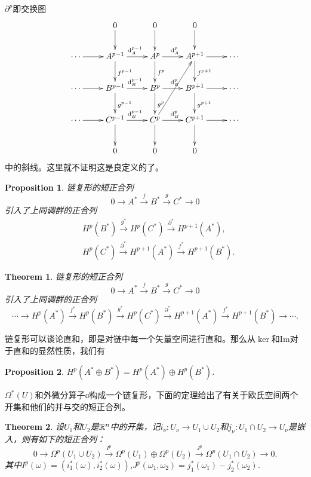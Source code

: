 \documentclass[11pt]{extbook}
\theoremstyle{plain}%
\newtheorem{pro}{Proposition}[section]%
\newtheorem{theo}{Theorem}[section]%
\begin{document}
$\partial^p$即交换图
	\[
		\xymatrix{
		&0\ar[d]&0\ar[d]&0\ar[d]&\\
\cdots\ar[r]&A^{p-1}\ar[r]^{\dd_A^{p-1}}\ar[d]^{f^{p-1}}&A^p\ar[r]^{\dd_A^p}\ar[d]^{f^{p}}&A^{p+1}\ar[r]\ar[d]^{f^{p+1}}&\cdots\\
\cdots\ar[r]&B^{p-1}\ar[r]^{\dd_B^{p-1}}\ar[d]^{g^{p-1}}&B^p\ar[r]^{\dd_B^p}\ar[d]^{g^{p}}&B^{p+1}\ar[r]\ar[d]^{g^{p+1}}&\cdots\\
\cdots\ar[r]&C^{p-1}\ar[r]^{\dd_B^{p-1}}\ar[d]&C^p\ar[r]^{\dd_B^p}\ar[d]\ar[ruu]&C^{p+1}\ar[r]\ar[d]&\cdots\\
&0&0&0&
		}
	\]
中的斜线。这里就不证明这是良定义的了。

\begin{pro}
链复形的短正合列
\[
0\to A^*\xrightarrow{f}B^*\xrightarrow{g}C^*\to 0
\]
引入了上同调群的正合列
\[
\begin{split}
&H^p(B^*)\xrightarrow{g^*}H^p(C^*)\xrightarrow{\partial^*}H^{p+1}(A^*),\\
&H^p(C^*)\xrightarrow{\partial^*}H^{p+1}(A^*)\xrightarrow{f^*}H^{p+1}(B^*).
\end{split}
\]
\end{pro}
\begin{theo}
\label{changzhenghelie}
链复形的短正合列
\[
0\to A^*\xrightarrow{f}B^*\xrightarrow{g}C^*\to 0
\]
引入了上同调群的正合列
\[
\cdots\to H^p(A^*)\xrightarrow{f^*}H^p(B^*)\xrightarrow{g^*}H^p(C^*)\xrightarrow{\partial^*}H^{p+1}(A^*)\xrightarrow{f^*}H^{p+1}(B^*)\to\cdots.
\]
\end{theo}
链复形可以谈论直和，即是对链中每一个矢量空间进行直和。那么从$\ker$和$\mathrm{Im}$对于直和的显然性质，我们有
\begin{pro}
\label{zhihe}
$H^p(A^*\oplus B^*)=H^p(A^*)\oplus H^p(B^*)$.
\end{pro}
$\Omega^*(U)$和外微分算子$\dd$构成一个链复形，下面的定理给出了有关于欧氏空间两个开集和他们的并与交的短正合列。
\begin{theo}
设$U_1$和$U_2$是$\mathbb{R}^n$中的开集，记$i_\nu:U_\nu \to U_1 \cup U_2$和$j_\nu:U_1\cap U_2 \to U_\nu$是嵌入，则有如下的短正合列：
\[
0\to \Omega^p(U_1\cup U_2)\xrightarrow{I^p}\Omega^p(U_1)\oplus\Omega^p(U_2)\xrightarrow{J^p}\Omega^p(U_1\cap U_2)\to 0.
\]
其中$I^p(\omega)=(i_1^*(\omega),i_2^*(\omega))$,$J^p(\omega_1,\omega_2)=j_1^*(\omega_1)-j_2^*(\omega_2)$.
\end{theo}
\end{document}
